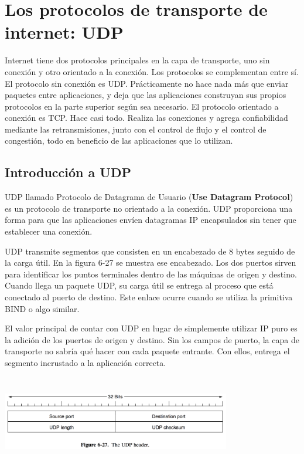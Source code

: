 \documentclass[10pt,a4paper]{report}
\begin{document}
\section{Los protocolos de transporte de internet: UDP}
	\par Internet tiene dos protocolos principales en la capa de transporte, uno sin conexión y otro orientado a la conexión. Los protocolos se complementan entre sí. El protocolo sin conexión es UDP. Prácticamente no hace nada más que enviar paquetes entre aplicaciones, y deja que las aplicaciones construyan sus propios protocolos en la parte superior según sea necesario. El protocolo orientado a conexión es TCP. Hace casi todo. Realiza las conexiones y agrega confiabilidad mediante las retransmisiones, junto con el control de flujo y el control de congestión, todo en beneficio de las aplicaciones que lo utilizan.

\subsection{Introducción a UDP}

	\par UDP llamado Protocolo de Datagrama de Usuario (\textbf{Use Datagram Protocol}) es un protocolo de transporte no orientado a la conexión. UDP proporciona una forma para que las aplicaciones envíen datagramas IP encapsulados sin tener que establecer una conexión.
	
	\par UDP transmite segmentos que consisten en un encabezado de 8 bytes seguido de la carga útil. En la figura 6-27 se muestra ese encabezado. Los dos puertos sirven para identificar los puntos terminales dentro de las máquinas de origen y destino. Cuando llega un paquete UDP, su carga útil se entrega al proceso que está conectado al puerto de destino. Este enlace ocurre cuando se utiliza la primitiva BIND o algo similar.
	
	\par El valor principal de contar con UDP en lugar de simplemente utilizar IP puro es la adición de los puertos de origen y destino. Sin los campos de puerto, la capa de transporte no sabría qué hacer con cada paquete entrante. Con ellos, entrega el segmento incrustado a la aplicación correcta.
	
	\begin{center}
		\includegraphics[width=10cm, height=4cm]{./imagenes/udp.png} 
	\end{center}
	
\end{document}
